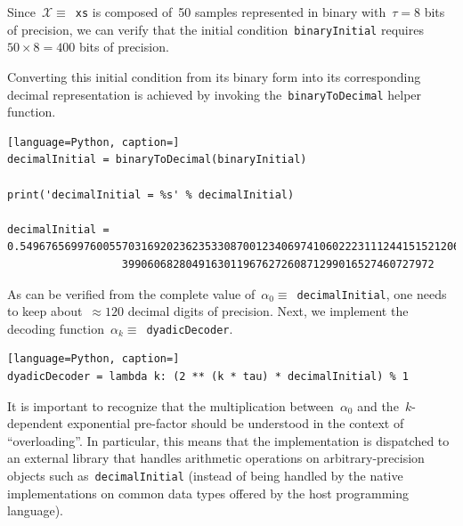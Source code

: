 \documentclass{article}
\begin{document}
\vspace{0.3cm}

\noindent Since~$\mathcal{X}\equiv$~\texttt{xs} is composed of~50 samples represented in binary with~$\tau=8$ bits of precision, we can verify that the initial condition~\texttt{binaryInitial} requires~$50 \times 8 = 400$ bits of precision. 

\newpage

\noindent Converting this initial condition from its binary form into its corresponding decimal representation is achieved by invoking the~\texttt{binaryToDecimal} helper function. \\
\begin{lstlisting}[language=Python, caption=]
decimalInitial = binaryToDecimal(binaryInitial)

print('decimalInitial = %s' % decimalInitial)

decimalInitial = 0.5496765699760055703169202362353308700123406974106022231112441515212066847
                  3990606828049163011967627260871299016527460727972        

\end{lstlisting}

\vspace{0.3cm}

\noindent As can be verified from the complete value of~$\alpha_0 \equiv$~\texttt{decimalInitial}, one needs to keep about~$\approx 120$ decimal digits of precision.  Next, we implement the decoding function~$\alpha_k \equiv$~\texttt{dyadicDecoder}. \\
\begin{lstlisting}[language=Python, caption=]
dyadicDecoder = lambda k: (2 ** (k * tau) * decimalInitial) % 1
\end{lstlisting}

\vspace{0.3cm}

\noindent It is important to recognize that the multiplication between~$\alpha_0$ and the~$k$-dependent exponential pre-factor should be understood in the context of ``overloading''.  In particular, this means that the implementation is dispatched to an external library that handles arithmetic operations on arbitrary-precision objects such as~\texttt{decimalInitial} (instead of being handled by the native implementations on common data types offered by the host programming language). \\
\end{document}
